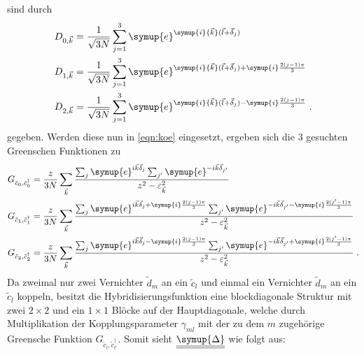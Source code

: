 sind durch
\begin{equation}
    \begin{aligned}
    D_{0,\vec{k}} &= \frac{1}{\sqrt{3N}}\sum_{j=1}^3\symup{e}^{\symup{i}{\vec{k}}(\vec{l}+\vec{\delta}_j)} \\
    D_{1,\vec{k}} &= \frac{1}{\sqrt{3N}}\sum_{j=1}^3\symup{e}^{\symup{i}{\vec{k}}(\vec{l}+\vec{\delta}_j)+\symup{i}\frac{2(j-1)\pi}{3}}  \\
    D_{2,\vec{k}} &= \frac{1}{\sqrt{3N}}\sum_{j=1}^3\symup{e}^{\symup{i}{\vec{k}}(\vec{l}+\vec{\delta}_j)-\symup{i}\frac{2(j-1)\pi}{3}} \; . \label{eqn:fourierko}
    \end{aligned}    
\end{equation}
gegeben.
Werden diese nun in \eqref{eqn:koe} eingesetzt, ergeben sich die 3 gesuchten Greenschen Funktionen zu 
\begin{align}
    G_{\tilde{c}_0, \tilde{c}^\dagger_0} &= \frac{z}{3N} \sum_{\vec{k}} \frac{\sum_j \symup{e}^{i{\vec{k}}\vec{\delta}_j} \sum_{j'} \symup{e}^{-i{\vec{k}}\vec{\delta}_{j'}}                                                            }{z^2-\varepsilon_{\vec{k}}^2} \\
    G_{\tilde{c}_1, \tilde{c}^\dagger_1} &= \frac{z}{3N} \sum_{\vec{k}} \frac{\sum_j \symup{e}^{i{\vec{k}}\vec{\delta}_j+\symup{i}\frac{2(j-1)\pi}{3}} \sum_{j'} \symup{e}^{-i{\vec{k}}\vec{\delta}_{j'}-\symup{i}\frac{2(j'-1)\pi}{3}} }{z^2-\varepsilon_{\vec{k}}^2} \\
    G_{\tilde{c}_2, \tilde{c}^\dagger_2} &= \frac{z}{3N} \sum_{\vec{k}} \frac{\sum_j \symup{e}^{i{\vec{k}}\vec{\delta}_j-\symup{i}\frac{2(j-1)\pi}{3}} \sum_{j'} \symup{e}^{-i{\vec{k}}\vec{\delta}_{j'}+\symup{i}\frac{2(j'-1)\pi}{3}} }{z^2-\varepsilon_{\vec{k}}^2} \; .
\end{align}
Da zweimal nur zwei Vernichter $\tilde{d}_m$ an ein $\tilde{c}_l$ und einmal ein  Vernichter $\tilde{d}_m$ an ein $\tilde{c}_l$ koppeln, besitzt die Hybridisierungsfunktion
eine blockdiagonale Struktur mit zwei $2 \times 2$ und ein $1 \times 1$ Blöcke auf der Hauptdiagonale, welche 
durch Multiplikation der Kopplungsparameter $\gamma_{ml}$ mit der zu dem $m$ zugehörige Greensche Funktion $G_{\tilde{c}_l, \tilde{c}^\dagger_{l'}}$.
Somit sieht $\underline{\underline{\symup{\Delta}}}$ wie folgt aus:
